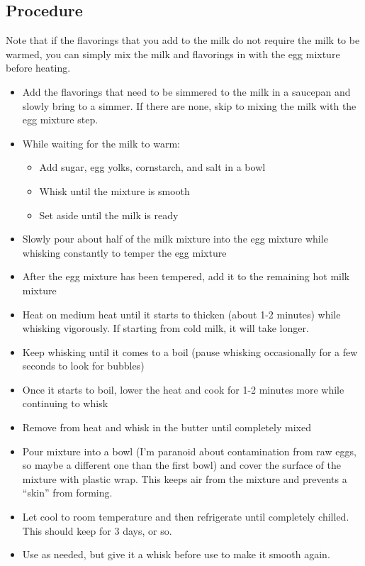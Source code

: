 \documentclass[10pt, openany]{book}
\begin{document}
\subsection{Procedure}
Note that if the flavorings that you add to the milk do not require the milk to be warmed, you can simply mix the milk and flavorings in with the egg mixture before heating.
\begin{itemize}
  \item Add the flavorings that need to be simmered to the milk in a saucepan and slowly bring to a simmer.  If there are none, skip to mixing the milk with the egg mixture step.
  \item While waiting for the milk to warm:
  \begin{itemize}
    \item Add sugar, egg yolks, cornstarch, and salt in a bowl
    \item Whisk until the mixture is smooth
    \item Set aside until the milk is ready
  \end{itemize}
  \item Slowly pour about half of the milk mixture into the egg mixture while whisking constantly to temper the egg mixture
  \item After the egg mixture has been tempered, add it to the remaining hot milk mixture
  \item Heat on medium heat until it starts to thicken (about 1-2 minutes) while whisking vigorously.  If starting from cold milk, it will take longer.
  \item Keep whisking until it comes to a boil (pause whisking occasionally for a few seconds to look for bubbles)
  \item Once it starts to boil, lower the heat and cook for 1-2 minutes more while continuing to whisk
  \item Remove from heat and whisk in the butter until completely mixed
  \item Pour mixture into a bowl (I'm paranoid about contamination from raw eggs, so maybe a different one than the first bowl) and cover the surface of the mixture with plastic wrap.  This keeps air from the mixture and prevents a ``skin'' from forming.
  \item Let cool to room temperature and then refrigerate until completely chilled.  This should keep for 3 days, or so.
  \item Use as needed, but give it a whisk before use to make it smooth again.
\end{itemize}
\end{document}
